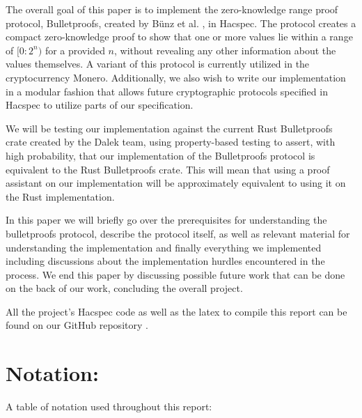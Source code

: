 \documentclass{article}
\begin{document}
The overall goal of this paper is to implement the zero-knowledge
range proof protocol, Bulletproofs, created by Bünz et
al. \cite{bulletproofs}, in Hacspec. The protocol creates a compact
zero-knowledge proof to show that one or more values lie within a
range of $[0:2^n)$ for a provided $n$, without revealing any other
information about the values themselves. A variant of this protocol
is currently utilized in the cryptocurrency Monero. Additionally,
we also wish to write our implementation in a modular fashion that
allows future cryptographic protocols specified in Hacspec to utilize
parts of our specification.

We will be testing our implementation against the current Rust
Bulletproofs crate \cite{dalek} created by the Dalek team, using property-based
testing to assert, with high probability, that our implementation of the
Bulletproofs protocol is equivalent to the Rust Bulletproofs crate. This
will mean that using a proof assistant on our implementation will be 
approximately equivalent to using it on the Rust implementation.

In this paper we will briefly go over the prerequisites for
understanding the bulletproofs protocol, describe the protocol itself,
as well as relevant material for understanding the implementation
and finally everything we implemented including discussions about the
implementation hurdles encountered in the process. We end this paper
by discussing possible future work that can be done on the back of
our work, concluding the overall project.

All the project's Hacspec code as well as the latex to
compile this report can be found on our GitHub repository
\cite{hacspec-bulletproofs}.


\newpage

\section{Notation:} \label{notation}

A table of notation used throughout this report:
\end{document}
